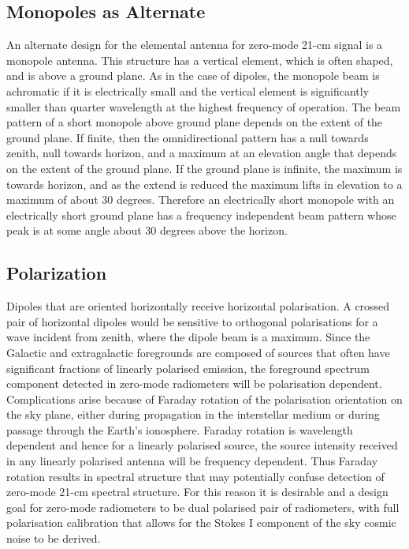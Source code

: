    \subsection{Monopoles as Alternate}
   
   An alternate design for the elemental antenna for zero-mode 21-cm signal is a monopole antenna.  This structure has a vertical element, which is often shaped, and is above a ground plane.  As in the case of dipoles, the monopole beam is achromatic if it is electrically small and the vertical element is significantly smaller than quarter wavelength at the highest frequency of operation.  The beam pattern of a short monopole above ground plane depends on the extent of the ground plane. If finite, then the omnidirectional pattern has a null towards zenith, null towards horizon, and a maximum at an elevation angle that depends on the extent of the ground plane.  If the ground plane is infinite, the maximum is towards horizon, and as the extend is reduced the maximum lifts in elevation to a maximum of about 30 degrees.  Therefore an electrically short monopole with an electrically short ground plane has a frequency independent beam pattern whose peak is at some angle about 30 degrees above the horizon.
   
\subsection{Polarization}
   
   Dipoles that are oriented horizontally receive horizontal polarisation.  A crossed pair of horizontal dipoles would be sensitive to orthogonal polarisations for a wave incident from zenith, where the dipole beam is a maximum.  Since the Galactic and extragalactic foregrounds are composed of sources that often have significant fractions of linearly polarised emission, the foreground spectrum component detected in zero-mode radiometers will be polarisation dependent.  Complications arise because of Faraday rotation of the polarisation orientation on the sky plane, either during propagation in the interstellar medium or during passage through the Earth's ionosphere.  Faraday rotation is wavelength dependent and hence for a linearly polarised source, the source intensity received in any linearly polarised antenna will be frequency dependent.  Thus Faraday rotation results in spectral structure that may potentially confuse detection of zero-mode 21-cm spectral structure.  For this reason it is desirable and a design goal for zero-mode radiometers to be dual polarised pair of radiometers, with full polarisation calibration that allows for the Stokes I component of the sky cosmic noise to be derived.

